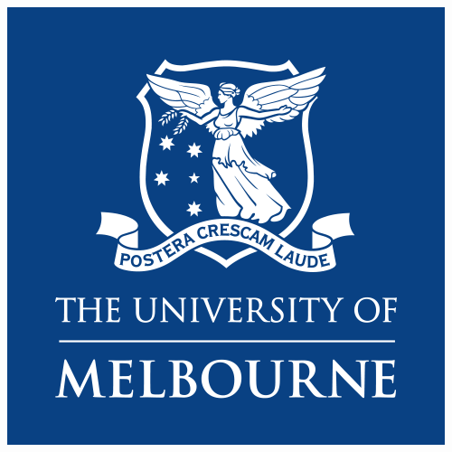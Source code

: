 \documentclass[
11pt, %
oneside, %
english, %
singlespacing, %
headsepline, %
chapterinoneline, %
consistentlayout, %
]{MastersDoctoralThesis} %
\author{San Kho \textsc{Lin}} %
\begin{document}
\frontmatter %

\pagestyle{plain} %


\begin{titlepage}
\begin{center}

\vspace*{.06\textheight}
{\scshape\LARGE \univname\par}\vspace{1.5cm} %
\includegraphics{PRIMARY_A_Vertical_Housed_RGB.png}

\HRule \\[0.4cm] %
{\huge \bfseries \ttitle\par}\vspace{0.4cm} %
\HRule \\[1.5cm] %
 

\end{center}
\end{titlepage}
\end{document}
